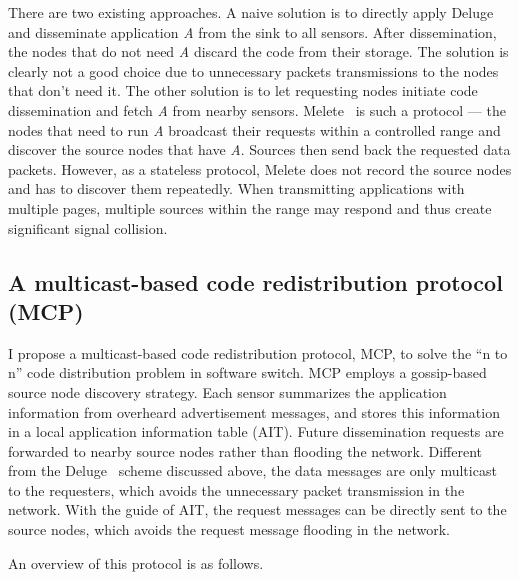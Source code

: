 There are two existing approaches. A naive solution is to directly apply Deluge and disseminate application {\it A} 
from the sink to all sensors. After dissemination, the nodes that do not need {\it A} discard the code from their 
storage. The solution is clearly not a good choice due to unnecessary packets transmissions to the nodes that don't 
need it. The other solution is to let requesting nodes initiate code dissemination and fetch {\it A} from nearby 
sensors. Melete~\cite{melete} is such a protocol --- the nodes that need to run {\it A} broadcast their requests within 
a controlled range and discover the source nodes that have {\it A}. Sources then send back the requested data packets. 
However, as a stateless protocol, Melete does not record the source nodes and has to discover them repeatedly. When 
transmitting applications with multiple pages, multiple sources within the range may respond and thus create 
significant signal collision. 


\subsection{A multicast-based code redistribution protocol (MCP)}


I propose a multicast-based code redistribution protocol,  MCP, to solve the ``n to n'' code distribution problem in 
software switch. MCP employs a gossip-based source node discovery strategy. Each sensor summarizes the application 
information from overheard advertisement messages, and stores this information in a local application information table 
(AIT). Future dissemination requests are forwarded to nearby source nodes rather than flooding the network.
Different from the Deluge~\cite{deluge} scheme discussed above, the data messages are only multicast to the requesters, 
which avoids the unnecessary packet transmission in the network. With the guide of AIT, the request messages can be 
directly sent to the source nodes, which avoids the request message flooding in the network.  

An overview of this protocol is as follows.

